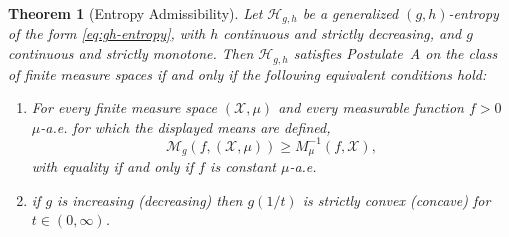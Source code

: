 \documentclass[10pt,a4paper]{amsart}
\newtheorem{thm}{Theorem}
\begin{document}
\begin{thm}[Entropy Admissibility]
    \label{thm:ent-admit}
Let $\mathcal{H}_{g,h}$ be a generalized
$(g,h)$-entropy of the form \eqref{eq:gh-entropy}, with $h$ continuous  and strictly decreasing,
and $g$ continuous and strictly monotone. Then $\mathcal{H}_{g,h}$ satisfies Postulate~A
on the class of finite measure spaces if and only if the following equivalent
conditions hold:
\begin{enumerate}
  \item[(a)] For every finite measure space $(\mathcal{X},\mu)$ and every measurable function
$f>0$ $\mu$-a.e. for which the displayed means are defined,
  \begin{equation}
\label{eq:M-condition}
\mathcal{M}_g(f,(\mathcal{X},\mu))\geq M^{-1}_\mu(f,\mathcal{X}),
\end{equation}
with equality if and only if $f$ is constant $\mu$-a.e.
  \item[(b)] if $g$ is increasing (decreasing) then $g(1/t)$ is strictly convex (concave) for $t \in(0,\infty)$. 
\end{enumerate}
\end{thm}
\end{document}
